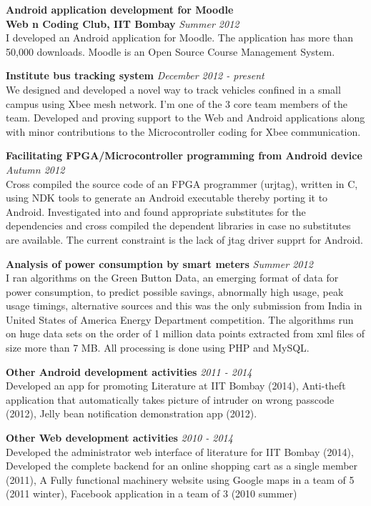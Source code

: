 \documentclass[margin,line]{resume}
\begin{document}
\begin{resume}
	{\bf Android application development for Moodle} \\
    {\bf Web n Coding Club, IIT Bombay} 	                                \hfill \textit{Summer 2012} \\ 
	 I developed an Android application for Moodle. The application has more than 50,000 downloads. Moodle is an Open Source Course Management System.
	
    {\bf Institute bus tracking system} \hfill \textit{December 2012 - present} \\
    We designed and developed a novel way to track vehicles confined in a small campus using Xbee mesh network. I'm one of the 3 core team members of the team. Developed and proving support to the Web and Android applications along with minor contributions to the Microcontroller coding for Xbee communication.
    	
    {\bf Facilitating FPGA/Microcontroller programming from Android device} \hfill \textit{Autumn 2012} \\
     Cross compiled the source code of an FPGA programmer (urjtag), written in C, using NDK tools to generate an Android executable thereby porting it to Android. Investigated into and found appropriate substitutes for the dependencies and cross compiled the dependent libraries in case no substitutes are available. The current constraint is the lack of jtag driver supprt for Android.
    	
    {\bf Analysis of power consumption by smart meters} \hfill \textit{Summer 2012} \\
     I ran algorithms on the Green Button Data, an emerging format of data for power consumption, to predict possible savings, abnormally high usage, peak usage timings, alternative sources and this was the only submission from India in United States of America Energy Department competition. The algorithms run on huge data sets on the order of 1 million data points extracted from xml files of size more than 7 MB. All processing is done using PHP and MySQL.
    	
    {\bf Other Android development activities} \hfill \textit{2011 - 2014} \\
    Developed an app for promoting Literature at IIT Bombay (2014), Anti-theft application that automatically takes picture of intruder on wrong passcode (2012), Jelly bean notification demonstration app (2012).
    	
    {\bf Other Web development activities} \hfill \textit{2010 - 2014} \\
    Developed the administrator web interface of literature for IIT Bombay (2014), Developed the complete backend for an online shopping cart as a single member (2011), A Fully functional machinery website using Google maps in a team of 5 (2011 winter), Facebook application in a team of 3 (2010 summer)
    

\end{resume}
\end{document}
